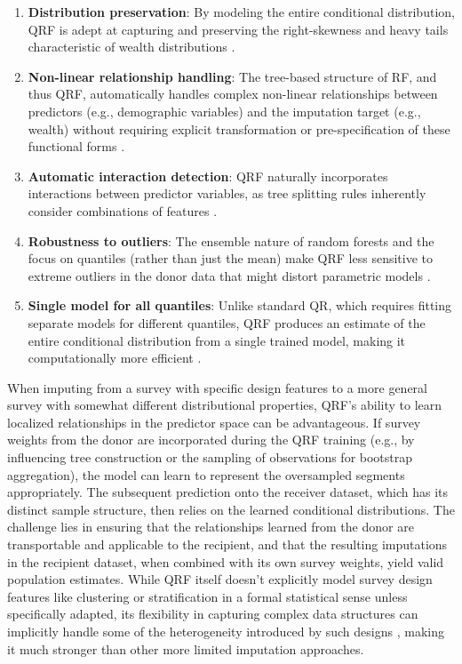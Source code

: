 \begin{enumerate}
    \item \textbf{Distribution preservation}: By modeling the entire conditional distribution, QRF is adept at capturing and preserving the right-skewness and heavy tails characteristic of wealth distributions \citep{meinshausen2006quantile}. 

    \item \textbf{Non-linear relationship handling}: The tree-based structure of RF, and thus QRF, automatically handles complex non-linear relationships between predictors (e.g., demographic variables) and the imputation target (e.g., wealth) without requiring explicit transformation or pre-specification of these functional forms \citep{tang2017random}.

    \item \textbf{Automatic interaction detection}: QRF naturally incorporates interactions between predictor variables, as tree splitting rules inherently consider combinations of features \citep{tang2017random}.

    \item \textbf{Robustness to outliers}:  The ensemble nature of random forests and the focus on quantiles (rather than just the mean) make QRF less sensitive to extreme outliers in the donor data that might distort parametric models \citep{tang2017random}.

    \item \textbf{Single model for all quantiles}: Unlike standard QR, which requires fitting separate models for different quantiles, QRF produces an estimate of the entire conditional distribution from a single trained model, making it computationally more efficient \citep{meinshausen2006quantile}.
\end{enumerate}

When imputing from a survey with specific design features to a more general survey with somewhat different distributional properties, QRF's ability to learn localized relationships in the predictor space can be advantageous. If survey weights from the donor are incorporated during the QRF training (e.g., by influencing tree construction or the sampling of observations for bootstrap aggregation), the model can learn to represent the oversampled segments appropriately. The subsequent prediction onto the receiver dataset, which has its distinct sample structure, then relies on the learned conditional distributions. The challenge lies in ensuring that the relationships learned from the donor are transportable and applicable to the recipient, and that the resulting imputations in the recipient dataset, when combined with its own survey weights, yield valid population estimates. While QRF itself doesn't explicitly model survey design features like clustering or stratification in a formal statistical sense unless specifically adapted, its flexibility in capturing complex data structures can implicitly handle some of the heterogeneity introduced by such designs \citep{hao2007quantile}, making it much stronger than other more limited imputation approaches.

